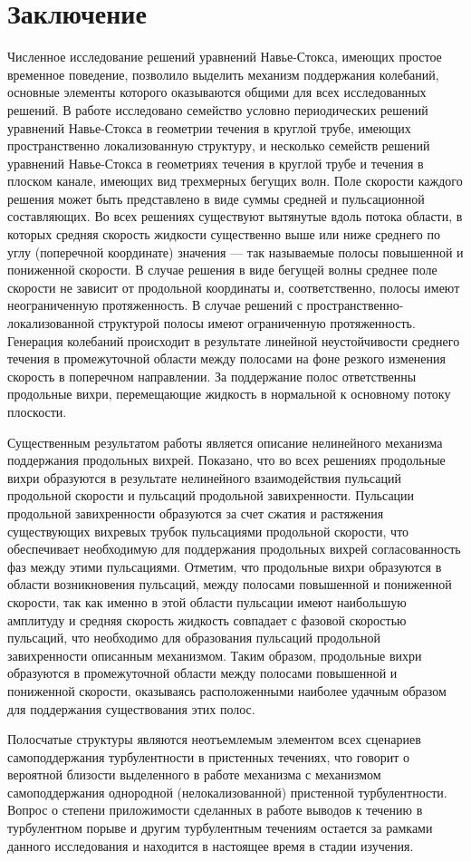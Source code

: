 \chapter*{Заключение} 


Численное исследование решений уравнений Навье-Стокса, имеющих простое временное поведение, позволило выделить механизм поддержания колебаний, основные элементы которого оказываются общими для всех исследованных решений. В работе исследовано семейство условно периодических решений уравнений Навье-Стокса в геометрии течения в круглой трубе, имеющих пространственно локализованную структуру, и несколько семейств решений уравнений Навье-Стокса в геометриях течения в круглой трубе и течения в плоском канале, имеющих вид трехмерных бегущих волн. Поле скорости каждого решения может быть представлено в виде суммы средней и пульсационной составляющих. Во всех решениях существуют вытянутые вдоль потока области, в которых средняя скорость жидкости существенно выше или ниже среднего по углу (поперечной координате) значения --- так называемые полосы повышенной и пониженной скорости. В случае решения в виде бегущей волны среднее поле скорости не зависит от продольной координаты и, соответственно, полосы имеют неограниченную протяженность. В случае решений с пространственно-локализованной структурой полосы имеют ограниченную протяженность. Генерация колебаний происходит в результате линейной неустойчивости среднего течения в промежуточной области между полосами на фоне резкого изменения скорость в поперечном направлении. За поддержание полос ответственны продольные вихри, перемещающие жидкость в нормальной к основному потоку плоскости. 

Существенным результатом работы является описание нелинейного механизма поддержания продольных вихрей. Показано, что во всех решениях продольные вихри образуются в результате нелинейного взаимодействия пульсаций продольной скорости и пульсаций продольной завихренности. Пульсации продольной завихренности образуются за счет сжатия и растяжения существующих вихревых трубок пульсациями продольной скорости, что обеспечивает необходимую для поддержания продольных вихрей согласованность фаз между этими пульсациями. Отметим, что продольные вихри образуются в области возникновения пульсаций, между полосами повышенной и пониженной скорости, так как именно в этой области пульсации имеют наибольшую амплитуду и средняя скорость жидкость совпадает с фазовой скоростью пульсаций, что необходимо для образования пульсаций продольной завихренности описанным механизмом. Таким образом, продольные вихри образуются в промежуточной области между полосами повышенной и пониженной скорости, оказываясь расположенными наиболее удачным образом для поддержания существования этих полос. 

Полосчатые структуры являются неотъемлемым элементом всех сценариев самоподдержания турбулентности в пристенных течениях, что говорит о вероятной близости выделенного в работе механизма с механизмом самоподдержания однородной (нелокализованной) пристенной турбулентности. Вопрос о степени приложимости сделанных в работе выводов к течению в турбулентном порыве и другим турбулентным течениям остается за рамками данного исследования и находится в настоящее время в стадии изучения.
